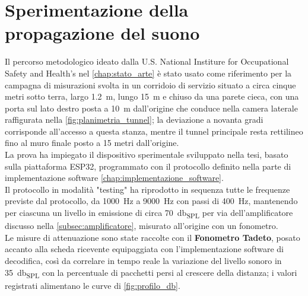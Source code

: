 \chapter{Sperimentazione della propagazione del suono}
\label{chap:sperimentazione_propagazione}

Il percorso metodologico ideato dalla U.S. National Institure for Occupational Safety and Health's\citep{jacksha2016} nel \autoref{chap:stato_arte} 
è stato usato come riferimento per la campagna 
di misurazioni svolta in un corridoio di servizio situato a circa cinque metri sotto terra, largo 
\SI{1.2}{\meter}, lungo \SI{15}{\meter} e chiuso da una parete cieca, con una porta sul lato destro posta a \SI{10}{\meter} 
dall'origine che conduce nella camera laterale raffigurata nella \autoref{fig:planimetria_tunnel}; la deviazione a novanta gradi
 corrisponde all'accesso a questa stanza, mentre il tunnel principale resta rettilineo fino al muro finale posto a 15 metri dall'origine.\\ 
 La prova ha impiegato il dispositivo sperimentale sviluppato nella tesi, basato sulla piattaforma ESP32, 
 programmato con il protocollo definito nella parte di implementazione software \autoref{chap:implementazione_software}.\\
  Il protocollo in modalità "testing" ha riprodotto in sequenza tutte le frequenze previste dal protocollo, da \SI{1000}{\hertz} a \SI{9000}{\hertz}
   con passi di \SI{400}{\hertz}, mantenendo per ciascuna un livello in emissione di circa \SI{70}{\decibel_{SPL}} per via dell'amplificatore discusso nella
    \autoref{subsec:amplificatore}, 
    misurato all'origine con un fonometro.\\
    Le misure di attenuazione sono state raccolte con il \textbf{Fonometro Tadeto}, posato accanto alla scheda
     ricevente equipaggiata con l'implementazione software di decodifica, così da correlare in tempo reale la variazione del livello sonoro in \SI{35}{\decibel_{SPL}} con
      la percentuale di pacchetti persi al crescere della distanza; i valori registrati alimentano le curve di \autoref{fig:profilo_db}.\\

